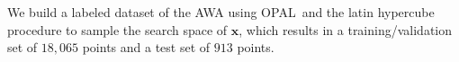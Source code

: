 \documentclass[a4paper, 12pt, version-1-compatibility]{article}
\def\opal{OPAL}
\newcommand{\myvec}[1]{\mathbf{#1}}
\begin{document}
We build a labeled dataset of the AWA using \opal\ and the latin hypercube procedure \cite{McKay_1979} to sample the search space of $\myvec{x}$, which results in a training/validation set of $18,065$ points and a test set of $913$ points.


\end{document}
